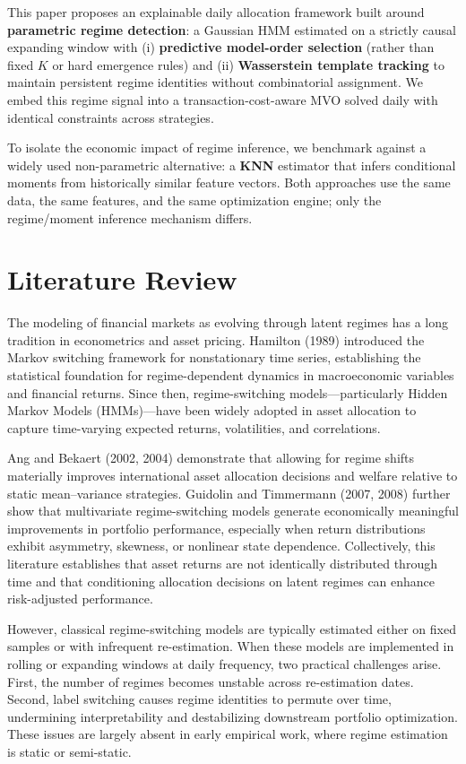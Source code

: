 \documentclass[11pt]{article}
\begin{document}
This paper proposes an explainable daily allocation framework built around \textbf{parametric regime detection}:
a Gaussian HMM estimated on a strictly causal expanding window with (i) \textbf{predictive model-order selection} (rather than fixed $K$ or hard emergence rules)
and (ii) \textbf{Wasserstein template tracking} to maintain persistent regime identities without combinatorial assignment.
We embed this regime signal into a transaction-cost-aware MVO solved daily with identical constraints across strategies.

To isolate the economic impact of regime inference, we benchmark against a widely used non-parametric alternative:
a \textbf{KNN} estimator that infers conditional moments from historically similar feature vectors.
Both approaches use the same data, the same features, and the same optimization engine; only the regime/moment inference mechanism differs.

\section{Literature Review}
\label{sec:literature}

The modeling of financial markets as evolving through latent regimes has a long tradition in econometrics and asset pricing. Hamilton (1989) introduced the Markov switching framework for nonstationary time series, establishing the statistical foundation for regime-dependent dynamics in macroeconomic variables and financial returns. Since then, regime-switching models—particularly Hidden Markov Models (HMMs)—have been widely adopted in asset allocation to capture time-varying expected returns, volatilities, and correlations.

Ang and Bekaert (2002, 2004) demonstrate that allowing for regime shifts materially improves international asset allocation decisions and welfare relative to static mean--variance strategies. Guidolin and Timmermann (2007, 2008) further show that multivariate regime-switching models generate economically meaningful improvements in portfolio performance, especially when return distributions exhibit asymmetry, skewness, or nonlinear state dependence. Collectively, this literature establishes that asset returns are not identically distributed through time and that conditioning allocation decisions on latent regimes can enhance risk-adjusted performance.

However, classical regime-switching models are typically estimated either on fixed samples or with infrequent re-estimation. When these models are implemented in rolling or expanding windows at daily frequency, two practical challenges arise. First, the number of regimes becomes unstable across re-estimation dates. Second, label switching causes regime identities to permute over time, undermining interpretability and destabilizing downstream portfolio optimization. These issues are largely absent in early empirical work, where regime estimation is static or semi-static.
\end{document}
